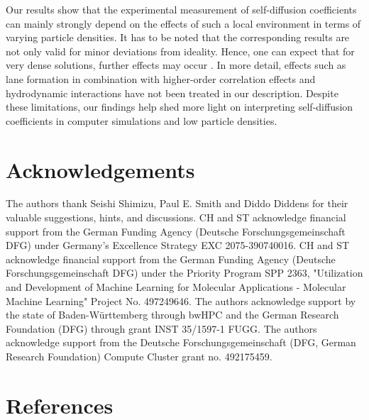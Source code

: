 \documentclass[aip,jcp,reprint]{revtex4-1}
\begin{document}
Our results show that the experimental measurement of self-diffusion coefficients can mainly strongly depend on the effects of such a local environment in terms of varying particle densities. It has to be noted that the corresponding results are not only valid for minor deviations from ideality. Hence, one can expect that for very dense solutions, further effects may occur \cite{rex08a}. In more detail, effects such as lane formation in combination with higher-order correlation effects and hydrodynamic interactions have not been treated in our description. Despite these limitations, our findings help shed more light on interpreting self-diffusion coefficients in computer simulations and low particle densities.  

\section{Acknowledgements}
The authors thank Seishi Shimizu, Paul E. Smith and Diddo Diddens for their valuable suggestions, hints, and discussions.
CH and ST acknowledge financial support from the German Funding Agency (Deutsche Forschungsgemeinschaft DFG) under Germany's Excellence Strategy EXC 2075-390740016.
CH and ST acknowledge financial support from the German Funding Agency (Deutsche Forschungsgemeinschaft DFG) under the Priority Program SPP 2363, "Utilization and Development of Machine Learning for Molecular Applications - Molecular Machine Learning" Project No. 497249646.
The authors acknowledge support by the state of Baden-Württemberg through bwHPC and the German Research Foundation (DFG) through grant INST 35/1597-1 FUGG.
The authors acknowledge support from the Deutsche Forschungsgemeinschaft (DFG, German Research Foundation) Compute Cluster grant no. 492175459.

\section*{References}


\end{document}
